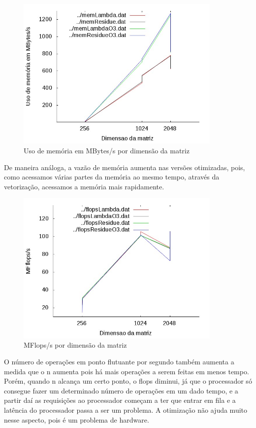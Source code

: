 \documentclass[12pt]{article}
\begin{document}
\begin{figure}[htb] \begin{center}
\includegraphics[width=100mm]{img/memUse.jpg} \end{center}
\caption{Uso de memória em MBytes/s por dimensão da matriz}\label{fig:usoMem}
\end{figure}

De maneira análoga, a vazão de memória aumenta nas versões otimizadas, pois,
como acessamos várias partes da memória ao mesmo tempo, através da vetorização,
acessamos a memória mais rapidamente.

\begin{figure}[htb] \begin{center}
\includegraphics[width=100mm]{img/flops.jpg} \end{center}
\caption{MFlops/s por dimensão da matriz}\label{fig:flops}
\end{figure}

O número de operações em ponto flutuante por segundo também aumenta a medida que
o n aumenta pois há mais operações a serem feitas em menos tempo. Porém, quando
n alcança um certo ponto, o flops diminui, já que o processador só consegue
fazer um determinado número de operações em um dado tempo, e a partir daí as
requisições ao processador começam a ter que entrar em fila e a latência do
processador passa a ser um problema. A otimização não ajuda muito nesse aspecto,
pois é um problema de hardware.
\end{document}
